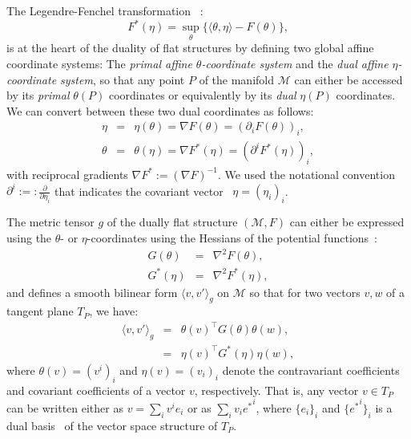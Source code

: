 \documentclass[graybox]{svmult}
\def\inner#1#2{{\langle #1,#2\rangle}}
\def\eqdef{:=}
\def\eqnota{:=:}
\def\calM{\mathcal{M}}
\begin{document}
The Legendre-Fenchel transformation~\cite{LegendreIG-2010} :
\begin{equation}
F^*(\eta)= \sup_\theta \{ \inner{\theta}{\eta}-F(\theta) \},
\end{equation} 
is at the heart of the duality of  flat structures by defining two global affine coordinate systems: The {\em primal affine $\theta$-coordinate system} and the {\em dual affine $\eta$-coordinate system}, so that any point $P$ of the manifold $\calM$ can  either be accessed by its {\em primal} $\theta(P)$ coordinates or equivalently by its {\em dual} $\eta(P)$ coordinates. 
We can convert between  these two dual coordinates as follows:
\begin{eqnarray}
 \eta&=&\eta(\theta)=\nabla F(\theta)=(\partial_i F(\theta))_i,\\
  \theta&=&\theta(\eta)=\nabla F^*(\eta)=(\partial^i F^*(\eta))_i,
	\end{eqnarray}
	with reciprocal gradients $\nabla F^* \eqdef (\nabla F)^{-1}$. 
	We used the notational convention $\partial^i \eqnota \frac{\partial}{\partial \eta_i}$ that indicates the covariant vector~\cite{tensor-2011} $\eta=(\eta_i)_i$.


The metric tensor $g$ of the dually flat structure $(\calM,F)$  can either be expressed using the $\theta$- or $\eta$-coordinates using the Hessians of the potential functions~\cite{HIG-2007}:
\begin{eqnarray}
G(\theta)&=&\nabla^2 F(\theta),\\
G^*(\eta)&=&\nabla^2 F^* (\eta),
\end{eqnarray}
and defines a smooth bilinear form ${\inner{v}{v'}}_g$ on $\calM$ so that for two vectors $v,w$ of a tangent plane $T_P$, we have:
\begin{eqnarray}
{\inner{v}{v'}}_g &=& \theta(v)^\top G(\theta) \theta(w),\\
 &=& \eta(v)^\top G^*(\eta) \eta(w),
\end{eqnarray}
where $\theta(v)=(v^i)_i$ and $\eta(v)=(v_i)_i$ denote the contravariant coefficients and covariant coefficients of a vector $v$, respectively.
That is,  any vector $v\in T_P$ can be written either as $v=\sum_i v^ie_i$ or as $\sum_i v_i{e^*}^i$, where  $\{e_i\}_i$ and
 $\{{e^*}^i\}_i$ is a dual basis~\cite{tensor-2011} of the vector space structure of $T_P$.
\end{document}
